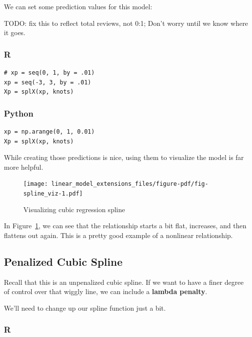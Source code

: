 \documentclass[
  letterpaper,
]{krantz}
\begin{document}
We can set some prediction values for this model:

TODO: fix this to reflect total reviews, not 0:1; Don't worry until we
know where it goes.

\subsubsection{R}

\begin{verbatim}
# xp = seq(0, 1, by = .01)
xp = seq(-3, 3, by = .01)
Xp = splX(xp, knots)  
\end{verbatim}

\subsubsection{Python}

\begin{verbatim}
xp = np.arange(0, 1, 0.01)
Xp = splX(xp, knots)
\end{verbatim}

While creating those predictions is nice, using them to visualize the
model is far more helpful.

\begin{figure}

{\centering \texttt{[image: linear\_model\_extensions\_files/figure-pdf/fig-spline\_viz-1.pdf]}

}

\caption{\label{fig-spline_viz}Visualizing cubic regression spline}

\end{figure}

In Figure~\ref{fig-spline_viz}, we can see that the relationship starts
a bit flat, increases, and then flattens out again. This is a pretty
good example of a nonlinear relationship.

\subsection{Penalized Cubic Spline}\label{sec-gam-penalty}

Recall that this is an unpenalized cubic spline. If we want to have a
finer degree of control over that wiggly line, we can include a
\textbf{lambda penalty}.

We'll need to change up our spline function just a bit.

\subsubsection{R}
\end{document}
